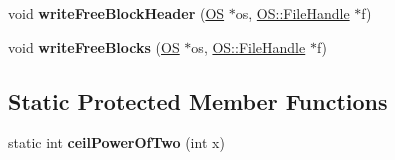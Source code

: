 \begin{DoxyCompactItemize}
\item 
void {\bfseries write\+Free\+Block\+Header} (\hyperlink{class_object_script_1_1_o_s}{OS} $\ast$os, \hyperlink{struct_object_script_1_1_o_s_1_1_file_handle}{O\+S\+::\+File\+Handle} $\ast$f)\hypertarget{class_object_script_1_1_o_s_heap_manager_a21e233003ef863eb384c230e61c00989}{}\label{class_object_script_1_1_o_s_heap_manager_a21e233003ef863eb384c230e61c00989}

\item 
void {\bfseries write\+Free\+Blocks} (\hyperlink{class_object_script_1_1_o_s}{OS} $\ast$os, \hyperlink{struct_object_script_1_1_o_s_1_1_file_handle}{O\+S\+::\+File\+Handle} $\ast$f)\hypertarget{class_object_script_1_1_o_s_heap_manager_a4c1726db9dcabe5c406b3720dcc09b8e}{}\label{class_object_script_1_1_o_s_heap_manager_a4c1726db9dcabe5c406b3720dcc09b8e}

\end{DoxyCompactItemize}
\subsection*{Static Protected Member Functions}
\begin{DoxyCompactItemize}
\item 
static int {\bfseries ceil\+Power\+Of\+Two} (int x)\hypertarget{class_object_script_1_1_o_s_heap_manager_aaa3063b60f1ffae3fc568937c7c15d28}{}\label{class_object_script_1_1_o_s_heap_manager_aaa3063b60f1ffae3fc568937c7c15d28}

\end{DoxyCompactItemize}
